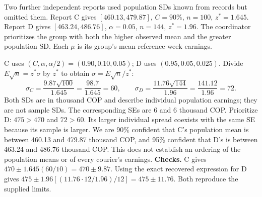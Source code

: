 Two further independent reports used population SDs known from records but omitted them. Report C gives $[460.13,479.87]$, $C=90\%$, $n=100$, $z^*=1.645$. Report D gives $[463.24,486.76]$, $\alpha=0.05$, $n=144$, $z^*=1.96$. The coordinator prioritizes the group with both the higher observed mean and the greater population SD.
Each $\mu$ is its group's mean reference-week earnings.\par C uses $(C,\alpha,\alpha/2)=(0.90,0.10,0.05)$; D uses $(0.95,0.05,0.025)$.
Divide $E\sqrt n=z^*\sigma$ by $z^*$ to obtain $\sigma=E\sqrt n/z^*$:
\[
\sigma_C=\frac{9.87\sqrt{100}}{1.645}=\frac{98.7}{1.645}=60,
\qquad \sigma_D=\frac{11.76\sqrt{144}}{1.96}=\frac{141.12}{1.96}=72.
\]
Both SDs are in thousand COP and describe individual population earnings; they are not sample SDs. The corresponding SEs are 6 and 6 thousand COP.
Prioritize D: $475>470$ and $72>60$. Its larger individual spread coexists with the same SE because its sample is larger. We are 90\% confident that C's population mean is between 460.13 and 479.87 thousand COP, and 95\% confident that D's is between 463.24 and 486.76 thousand COP. This does not establish an ordering of the population means or of every courier's earnings.
\textbf{Checks.} C gives $470\pm1.645(60/10)=470\pm9.87$. Using the exact recovered expression for D gives $475\pm1.96[(11.76\cdot12/1.96)/12]=475\pm11.76$. Both reproduce the supplied limits.
\clearpage
\begingroup %
\newcommand{\guidedresponsebox}[2][9mm]{%
    \tikz[baseline=(answer.base)]{%
        \node[fill=black!1,draw=black!25,line width=.3pt,
            rounded corners=2mm,inner sep=0pt,outer sep=.3pt,
            minimum width=#2,minimum height=#1] (answer) {\phantom{0}};}}

